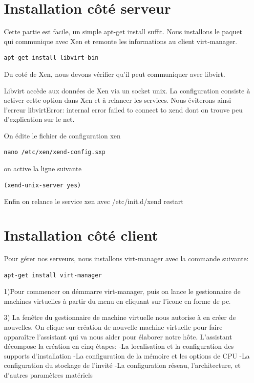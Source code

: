 \section{Installation côté serveur}
Cette partie est facile, un simple apt-get install suffit. Nous installons le paquet qui communique avec Xen et remonte les informations au client virt-manager.
\begin{lstlisting}
apt-get install libvirt-bin
\end{lstlisting} 
Du coté de Xen, nous devons vérifier qu’il peut communiquer avec libvirt.

Libvirt accède aux données de Xen via un socket unix. La configuration consiste à activer cette option dans Xen et à relancer les services.
Nous éviterons ainsi l’erreur libvirtError: internal error failed to connect to xend dont on trouve peu d’explication sur le net.

On édite le fichier de configuration xen
\begin{lstlisting} 
nano /etc/xen/xend-config.sxp
\end{lstlisting}
 on active la ligne suivante
\begin{lstlisting} 
(xend-unix-server yes)
\end{lstlisting}
 Enfin on relance le service xen avec /etc/init.d/xend restart

\section{Installation côté client}
Pour gérer nos serveurs, nous installons virt-manager avec la commande suivante:
\begin{lstlisting} 
apt-get install virt-manager
\end{lstlisting}


1)Pour commencer on démmarre virt-manager, puis on lance le gestionnaire de machines virtuelles à partir du menu en cliquant sur l'icone en forme de pc.



3) La fenêtre du gestionnaire de machine virtuelle nous autorise à en créer de nouvelles.
On clique sur création de nouvelle machine virtuelle pour faire apparaître l'assistant qui va nous aider pour élaborer notre hôte.
L'assistant décompose la création en cinq étapes:
-La localisation et la configuration des supports d'installation
-La configuration de la mémoire et les options de CPU
-La configuration du stockage de l'invité
-La configuration réseau, l'architecture, et d'autres paramètres matériels

